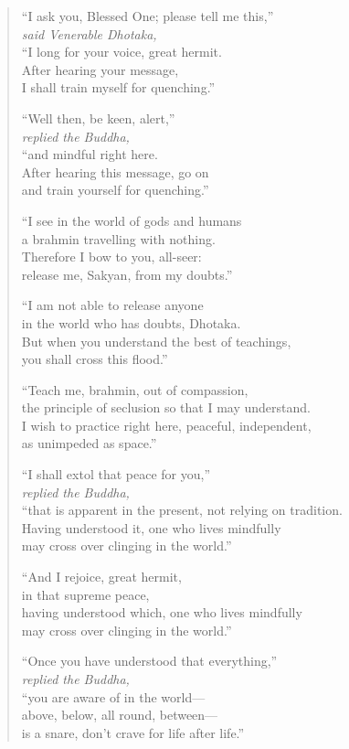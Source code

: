 \documentclass[12pt,openany]{book}%
\newcommand*{\scspeaker}[1]{\hspace{2em}\textit{#1}}
\begin{document}
\begin{verse}%
“I ask you, Blessed One; please tell me this,” \\
\scspeaker{said Venerable Dhotaka, }\\
“I long for your voice, great hermit. \\
After hearing your message, \\
I shall train myself for quenching.” 

“Well then, be keen, alert,” \\
\scspeaker{replied the Buddha, }\\
“and mindful right here. \\
After hearing this message, go on \\
and train yourself for quenching.” 

“I see in the world of gods and humans \\
a brahmin travelling with nothing. \\
Therefore I bow to you, all-seer: \\
release me, Sakyan, from my doubts.” 

“I am not able to release anyone \\
in the world who has doubts, Dhotaka. \\
But when you understand the best of teachings, \\
you shall cross this flood.” 

“Teach me, brahmin, out of compassion, \\
the principle of seclusion so that I may understand. \\
I wish to practice right here, peaceful, independent, \\
as unimpeded as space.” 

“I shall extol that peace for you,” \\
\scspeaker{replied the Buddha, }\\
“that is apparent in the present, not relying on tradition. \\
Having understood it, one who lives mindfully \\
may cross over clinging in the world.” 

“And I rejoice, great hermit, \\
in that supreme peace, \\
having understood which, one who lives mindfully \\
may cross over clinging in the world.” 

“Once you have understood that everything,” \\
\scspeaker{replied the Buddha, }\\
“you are aware of in the world—\\
above, below, all round, between—\\
is a snare, don’t crave for life after life.” 

%
\end{verse}
\end{document}
